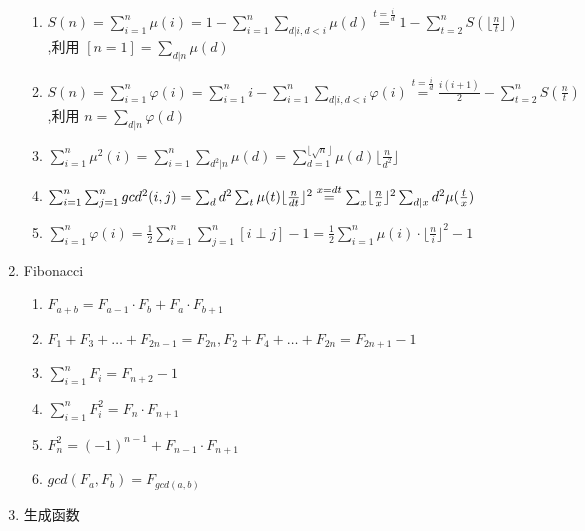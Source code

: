 \begin{enumerate}
\begin{enumerate}
	\item $S(n)=\sum_{i=1}^n \mu(i)=1-\sum_{i=1}^n \sum_{d|i,d < i}\mu(d) \overset{t=\frac id}{=} 1-\sum_{t=2}^nS(\lfloor \frac nt \rfloor)$,利用 $[n=1] = \sum_{d|n} \mu(d)$
	
	\item $S(n)=\sum_{i=1}^n \varphi(i)=\sum_{i=1}^n i-\sum_{i=1}^n \sum_{d|i,d<i} \varphi(i)\overset{t=\frac id}{=} \frac {i(i+1)}{2} - \sum_{t=2}^n S(\frac n t)$,利用 $n = \sum_{d|n} \varphi(d)$
	
	\item $\sum_{i=1}^n \mu^2(i) = \sum_{i=1}^n \sum_{d^2|n} \mu(d)=\sum_{d=1}^{\lfloor \sqrt n \rfloor}\mu(d) \lfloor \frac n {d^2} \rfloor$ 
	
	\item $\sum_{i=1}^n \sum_{j=1}^n gcd^2(i, j)= \sum_{d} d^2 \sum_{t} \mu(t) \lfloor \frac n{dt} \rfloor ^2 \\
	  \overset{x=dt}{=} \sum_{x} \lfloor \frac nx \rfloor ^ 2 \sum_{d|x} d^2 \mu(\frac tx)$
	
	\item $\sum_{i=1}^n \varphi(i)=\frac 12 \sum_{i=1}^n \sum_{j=1}^n [i \perp j] - 1=\frac 12 \sum_{i=1}^n \mu(i) \cdot\lfloor \frac n i \rfloor ^2-1$

\end{enumerate}

\item Fibonacci

\begin{enumerate}
	
	\item $F_{a+b}=F_{a-1} \cdot F_b+F_a \cdot F_{b+1}$
	
	\item $F_1+F_3+\dots +F_{2n-1} = F_{2n},F_2 + F_4 + \dots + F_{2n} = F_{2n + 1} - 1$
	
	\item $\sum_{i=1}^n F_i = F_{n+2} - 1$
	
	\item $\sum_{i=1}^n F_i^2 = F_n \cdot F_{n+1}$
	
	\item $F_n^2=(-1)^{n-1} + F_{n-1} \cdot F_{n+1}$
	
	\item $gcd(F_a, F_b)=F_{gcd(a, b)}$

\end{enumerate}

\item 生成函数

\begin{enumerate}


\end{enumerate}
\end{enumerate}
